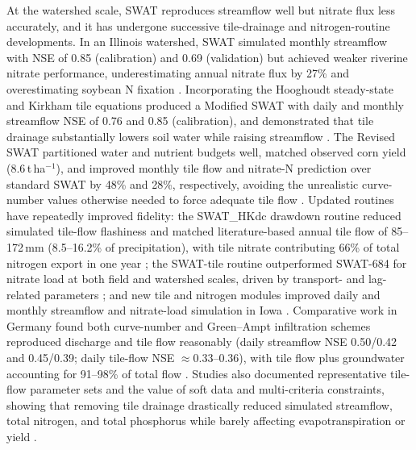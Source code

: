 \documentclass[11pt]{article}
\begin{document}
At the watershed scale, SWAT reproduces streamflow well but nitrate flux less accurately, and it has undergone successive tile-drainage and nitrogen-routine developments. In an Illinois watershed, SWAT simulated monthly streamflow with NSE of 0.85 (calibration) and 0.69 (validation) but achieved weaker riverine nitrate performance, underestimating annual nitrate flux by 27\% and overestimating soybean N fixation \parencite{Hu2007}. Incorporating the Hooghoudt steady-state and Kirkham tile equations produced a Modified SWAT with daily and monthly streamflow NSE of 0.76 and 0.85 (calibration), and demonstrated that tile drainage substantially lowers soil water while raising streamflow \parencite{Moriasi2012}. The Revised SWAT partitioned water and nutrient budgets well, matched observed corn yield (8.6\,t\,ha$^{-1}$), and improved monthly tile flow and nitrate-N prediction over standard SWAT by 48\% and 28\%, respectively, avoiding the unrealistic curve-number values otherwise needed to force adequate tile flow \parencite{Moriasi2013,Moriasi2013b}. Updated routines have repeatedly improved fidelity: the SWAT\_HKdc drawdown routine reduced simulated tile-flow flashiness and matched literature-based annual tile flow of 85--172\,mm (8.5--16.2\% of precipitation), with tile nitrate contributing 66\% of total nitrogen export in one year \parencite{Boles2015}; the SWAT-tile routine outperformed SWAT-684 for nitrate load at both field and watershed scales, driven by transport- and lag-related parameters \parencite{Kim2023}; and new tile and nitrogen modules improved daily and monthly streamflow and nitrate-load simulation in Iowa \parencite{Qi2025}. Comparative work in Germany found both curve-number and Green--Ampt infiltration schemes reproduced discharge and tile flow reasonably (daily streamflow NSE 0.50/0.42 and 0.45/0.39; daily tile-flow NSE $\approx$0.33--0.36), with tile flow plus groundwater accounting for 91--98\% of total flow \parencite{Bauwe2016}. Studies also documented representative tile-flow parameter sets \parencite{Guo2018b,Brighenti2023} and the value of soft data and multi-criteria constraints, showing that removing tile drainage drastically reduced simulated streamflow, total nitrogen, and total phosphorus while barely affecting evapotranspiration or yield \parencite{Nelson2018}.
\end{document}
